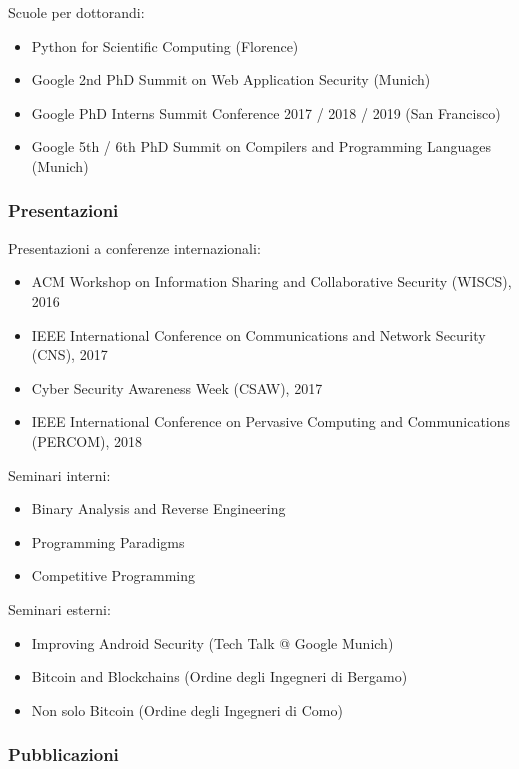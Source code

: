 \documentclass{article}
\begin{document}
\smallskip
\noindent Scuole per dottorandi:

\begin{itemize}
	\item Python for Scientific Computing (Florence)
	\item Google 2nd PhD Summit on Web Application Security (Munich)
	\item Google PhD Interns Summit Conference 2017 / 2018 / 2019 (San Francisco)
	\item Google 5th / 6th PhD Summit on Compilers and Programming Languages (Munich)
\end{itemize}

\subsubsection*{Presentazioni}

Presentazioni a conferenze internazionali:

\begin{itemize}
	\item ACM Workshop on Information Sharing and Collaborative Security (WISCS), 2016
	\item IEEE International Conference on Communications and Network Security (CNS), 2017
	\item Cyber Security Awareness Week (CSAW), 2017
	\item IEEE International Conference on Pervasive Computing and Communications (PERCOM), 2018
\end{itemize}

\noindent Seminari interni:

\begin{itemize}
	\item Binary Analysis and Reverse Engineering
	\item Programming Paradigms
	\item Competitive Programming
\end{itemize}

\noindent Seminari esterni:

\begin{itemize}
	\item Improving Android Security (Tech Talk @ Google Munich)
	\item Bitcoin and Blockchains (Ordine degli Ingegneri di Bergamo)
	\item Non solo Bitcoin (Ordine degli Ingegneri di Como)
\end{itemize}


\subsubsection*{Pubblicazioni}
\end{document}
